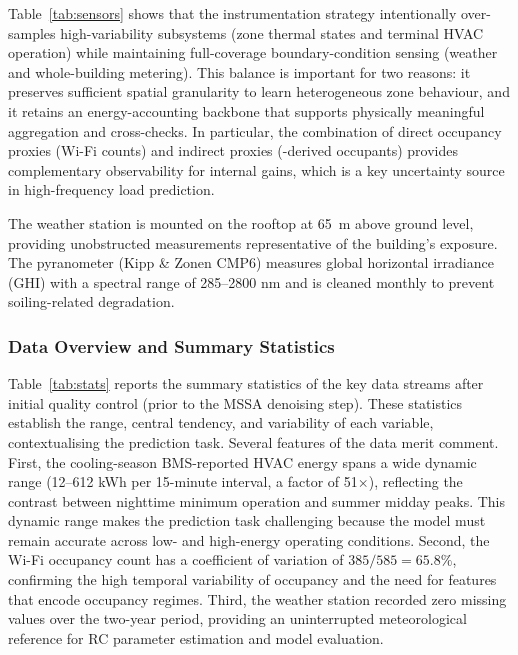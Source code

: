 \documentclass[11pt]{article}
\providecommand{\m}{\metre}
\begin{document}
Table~\ref{tab:sensors} shows that the instrumentation strategy intentionally over-samples high-variability subsystems (zone thermal states and terminal HVAC operation) while maintaining full-coverage boundary-condition sensing (weather and whole-building metering). This balance is important for two reasons: it preserves sufficient spatial granularity to learn heterogeneous zone behaviour, and it retains an energy-accounting backbone that supports physically meaningful aggregation and cross-checks. In particular, the combination of direct occupancy proxies (Wi-Fi counts) and indirect proxies (-derived occupants) provides complementary observability for internal gains, which is a key uncertainty source in high-frequency load prediction.

The weather station is mounted on the rooftop at \SI{65}{\m} above ground level, providing unobstructed measurements representative of the building's exposure. The pyranometer (Kipp \& Zonen CMP6) measures global horizontal irradiance (GHI) with a spectral range of 285–2800 nm and is cleaned monthly to prevent soiling-related degradation.

\subsubsection{Data Overview and Summary Statistics}

Table~\ref{tab:stats} reports the summary statistics of the key data streams after initial quality control (prior to the MSSA denoising step). These statistics establish the range, central tendency, and variability of each variable, contextualising the prediction task. Several features of the data merit comment. First, the cooling-season BMS-reported HVAC energy spans a wide dynamic range (12--612 kWh per 15-minute interval, a factor of 51$\times$), reflecting the contrast between nighttime minimum operation and summer midday peaks. This dynamic range makes the prediction task challenging because the model must remain accurate across low- and high-energy operating conditions. Second, the Wi-Fi occupancy count has a coefficient of variation of $385/585=65.8\%$, confirming the high temporal variability of occupancy and the need for features that encode occupancy regimes. Third, the weather station recorded zero missing values over the two-year period, providing an uninterrupted meteorological reference for RC parameter estimation and model evaluation.
\end{document}
